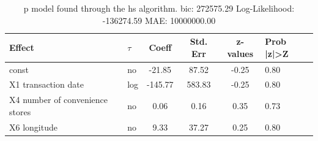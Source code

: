 \begin{table}
	\caption{p model found through the hs algorithm. bic: 272575.29 Log-Likelihood: -136274.59 MAE: 10000000.00}
	\begin{center}
		\begin{tabular}{|l|l|c|c|c|l|}
			\hline
			Effect & $\tau$ & Coeff & Std. Err & z-values & Prob |z|>Z \\
			\hline
			const & no & -21.85 & 87.52 & -0.25 & 0.80 \\
			\hline
			X1 transaction date & log & -145.77 & 583.83 & -0.25 & 0.80 \\
			\hline
			X4 number of convenience stores & no & 0.06 & 0.16 & 0.35 & 0.73 \\
			\hline
			X6 longitude & no & 9.33 & 37.27 & 0.25 & 0.80 \\
			\hline
		\end{tabular}
	\end{center}
\end{table}